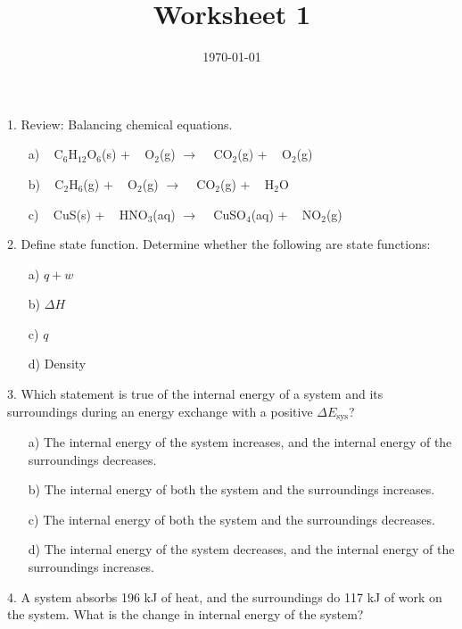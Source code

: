 \documentclass[11pt]{article}
\title{\textbf{Worksheet 1}}
\date{\vspace{-2em}\today}
\begin{document}
\maketitle

1. Review: Balancing chemical equations.
\begin{enumerate}
\item[a)] \,\,\, C$_6$H$_{12}$O$_6$(s) + \,\,\, O$_2$(g) $\rightarrow$ \,\,\, CO$_2$(g) + \,\,\, O$_2$(g)
\item[b)] \,\,\, C$_2$H$_6$(g) + \,\,\, O$_2$(g) $\rightarrow$ \,\,\, CO$_2$(g) + \,\,\, H$_2$O
\item[c)] \,\,\, CuS(s) + \,\,\, HNO$_3$(aq) $\rightarrow$ \,\,\, CuSO$_4$(aq) + \,\,\, NO$_2$(g)
\end{enumerate}

2. Define state function. Determine whether the following are state functions:
\begin{enumerate}
\item[a)] $q + w$ %
\item[b)] $\Delta H$ %
\item[c)] $q$ %
\item[d)] Density %
\end{enumerate}

3. Which statement is true of the internal energy of a system and its
surroundings during an energy exchange with a positive $\Delta E_\text{sys}$?
\begin{enumerate}
\item[a)] The internal energy of the system increases, and the internal
  energy of the surroundings decreases.
\item[b)] The internal energy of both the system and the surroundings
  increases.
\item[c)] The internal energy of both the system and the surroundings
  decreases.
\item[d)] The internal energy of the system decreases, and the internal
  energy of the surroundings increases.
\end{enumerate}

4. A system absorbs 196 kJ of heat, and the surroundings do 117 kJ
of work on the system. What is the change in internal energy of
the system?
\end{document}
